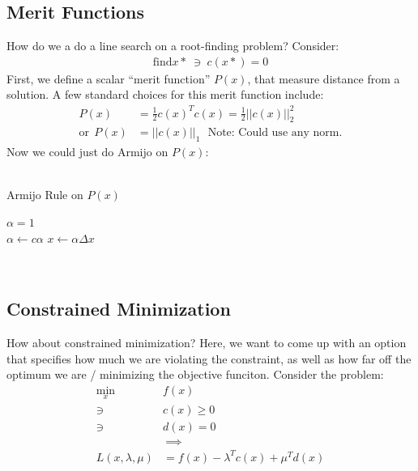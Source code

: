 \subsection{Merit Functions}
How do we a do a line search on a root-finding problem? Consider: 
\begin{align}
    \textrm{find} x* \ \ni \ c(x*) = 0
\end{align}
First, we define  a scalar ``merit function'' $P(x)$, that measure distance from a solution. 
A few standard choices for this merit function include: 
\begin{align}
    P(x) &= \frac{1}{2} c(x)^T c(x) = \frac{1}{2} || c(x) ||_{2}^2 \\
    \textrm{or} \ \ P(x) &= || c(x) ||_{1} \ \ \ \textrm{Note: Could use any norm}.
\end{align}
Now we could just do Armijo on $P(x)$: 
\\
\\
\noindent
\begin{algorithm}
	\caption{Armijo Rule on $P(x)$}
	\label{alg:armijo2}
	\begin{algorithmic}[1]	
        \State $\alpha = 1$  
         \\ 
            \State $\alpha \gets c \alpha$ 
        \EndWhile
        \State $x \gets \alpha \Delta x$
	\end{algorithmic}
\end{algorithm}
\\

\subsection{Constrained Minimization}
\noindent
How about constrained minimization? Here, we want to come up with an option that specifies how much we are violating the constraint, as well as how far off the optimum we are / minimizing the objective funciton. Consider the problem:
\begin{align}
    \min_x &f(x) \\
    \ni \ \ &c(x) \geq 0 \\
    \ni \ \ &d(x) = 0 \\
    \ &\ \implies \\
    L(x, \lambda, \mu) &= f(x) - \lambda^T c(x) + \mu^T d(x)
\end{align} \\

